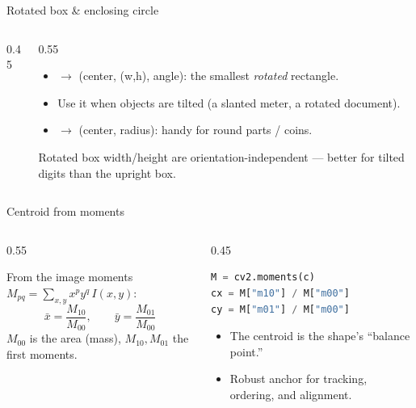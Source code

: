 \documentclass[10pt,aspectratio=169]{beamer}
\begin{document}
\begin{frame}{Rotated box \& enclosing circle}
  \begin{columns}[T]
    \begin{column}{0.45\textwidth}
    \begin{center}
    \end{center}
    \end{column}
    \begin{column}{0.55\textwidth}
      \begin{itemize}\scriptsize
        \item {} $\rightarrow$ (center, (w,h), angle): the smallest \emph{rotated} rectangle.
        \item Use it when objects are tilted (a slanted meter, a rotated document).
        \item {} $\rightarrow$ (center, radius): handy for round parts / coins.
      \end{itemize}
      \begin{goodbox}
        Rotated box width/height are orientation-independent — better for tilted digits than the upright box.
      \end{goodbox}
    \end{column}
  \end{columns}
\end{frame}

\begin{frame}[fragile]{Centroid from moments}
  \begin{columns}[T]
    \begin{column}{0.55\textwidth}
      \begin{mathbox}[Centroid]
        From the image moments $M_{pq}=\sum_{x,y} x^p y^q\,I(x,y)$:
        \[ \bar{x}=\frac{M_{10}}{M_{00}},\qquad \bar{y}=\frac{M_{01}}{M_{00}} \]
        $M_{00}$ is the area (mass), $M_{10},M_{01}$ the first moments.
      \end{mathbox}
    \end{column}
    \begin{column}{0.45\textwidth}
\begin{lstlisting}[language=Python,basicstyle=\ttfamily\tiny]
M = cv2.moments(c)
cx = M["m10"] / M["m00"]
cy = M["m01"] / M["m00"]
\end{lstlisting}
      \begin{itemize}\scriptsize
        \item The centroid is the shape's ``balance point.''
        \item Robust anchor for tracking, ordering, and alignment.
      \end{itemize}
    \end{column}
  \end{columns}
\end{frame}
\end{document}
